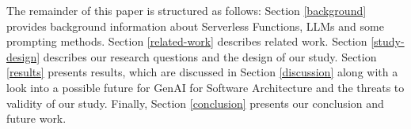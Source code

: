 
The remainder of this paper is structured as follows: Section \ref{background} provides background information about Serverless Functions, LLMs and some prompting methods. Section \ref{related-work} describes related work. Section \ref{study-design} describes our research questions and the design of our study. Section \ref{results} presents results, which are discussed in Section \ref{discussion} along with a look into a possible future for GenAI for Software Architecture and the threats to validity of our study. Finally, Section \ref{conclusion} presents our conclusion and future work. 
